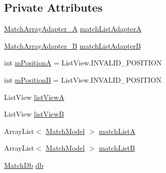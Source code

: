 \subsection*{Private Attributes}
\begin{DoxyCompactItemize}
\item 
\hyperlink{classorg_1_1buildmlearn_1_1matchtemplate_1_1adapter_1_1MatchArrayAdapter__A}{Match\+Array\+Adapter\+\_\+A} \hyperlink{classorg_1_1buildmlearn_1_1matchtemplate_1_1fragment_1_1MainActivityFragment_a9a376ecb83a0190f3d6659a50874c06b}{match\+List\+AdapterA}
\item 
\hyperlink{classorg_1_1buildmlearn_1_1matchtemplate_1_1adapter_1_1MatchArrayAdapter__B}{Match\+Array\+Adapter\+\_\+B} \hyperlink{classorg_1_1buildmlearn_1_1matchtemplate_1_1fragment_1_1MainActivityFragment_aabee4866cd1f4d60934bc6a2e449ccdf}{match\+List\+AdapterB}
\item 
int \hyperlink{classorg_1_1buildmlearn_1_1matchtemplate_1_1fragment_1_1MainActivityFragment_a657426d4464d06f1fa723547eebeb932}{m\+PositionA} = List\+View.\+I\+N\+V\+A\+L\+I\+D\+\_\+\+P\+O\+S\+I\+T\+I\+ON
\item 
int \hyperlink{classorg_1_1buildmlearn_1_1matchtemplate_1_1fragment_1_1MainActivityFragment_a9beaf8297f80f043a1a68ab7bd459bc9}{m\+PositionB} = List\+View.\+I\+N\+V\+A\+L\+I\+D\+\_\+\+P\+O\+S\+I\+T\+I\+ON
\item 
List\+View \hyperlink{classorg_1_1buildmlearn_1_1matchtemplate_1_1fragment_1_1MainActivityFragment_a0dd890c2f6cbc9e6693912bf3fc7eacc}{list\+ViewA}
\item 
List\+View \hyperlink{classorg_1_1buildmlearn_1_1matchtemplate_1_1fragment_1_1MainActivityFragment_ac1cd4780a9c771a665809b034dc0d0b9}{list\+ViewB}
\item 
Array\+List$<$ \hyperlink{classorg_1_1buildmlearn_1_1matchtemplate_1_1data_1_1MatchModel}{Match\+Model} $>$ \hyperlink{classorg_1_1buildmlearn_1_1matchtemplate_1_1fragment_1_1MainActivityFragment_a3aee1684c4996c91360db08c42e63bc3}{match\+ListA}
\item 
Array\+List$<$ \hyperlink{classorg_1_1buildmlearn_1_1matchtemplate_1_1data_1_1MatchModel}{Match\+Model} $>$ \hyperlink{classorg_1_1buildmlearn_1_1matchtemplate_1_1fragment_1_1MainActivityFragment_a9d7d36fa3f4eb61f8e4938bf7415a773}{match\+ListB}
\item 
\hyperlink{classorg_1_1buildmlearn_1_1matchtemplate_1_1data_1_1MatchDb}{Match\+Db} \hyperlink{classorg_1_1buildmlearn_1_1matchtemplate_1_1fragment_1_1MainActivityFragment_aab974fa5ad57571c89557b9d5bd4bec2}{db}

\end{DoxyCompactItemize}
